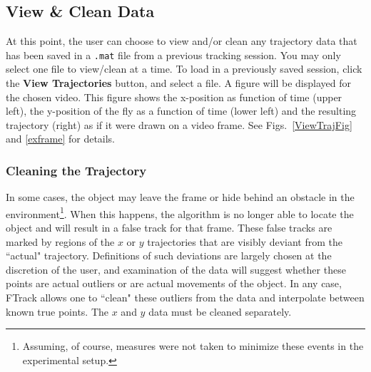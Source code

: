 \documentclass[letterpaper, 11pt]{article}
\begin{document}
\begin{enumerate}
\subsection*{View \& Clean Data}
At this point, the user can choose to view and/or clean any trajectory data that has been saved in
a \texttt{.mat} file from a previous tracking session.  You may only select one file to view/clean
at a time. To load in a previously saved session, click the \textbf{View Trajectories} button, and
select a file. A figure will be displayed for the chosen video.  This figure shows the x-position
as function of time (upper left), the y-position of the fly as a function of time (lower left) and
the resulting trajectory (right) as if it were drawn on a video frame.  See Figs.\
\ref{ViewTrajFig} and \ref{exframe} for details.


\subsubsection*{Cleaning the Trajectory} In some cases, the object may leave the frame or hide
behind an obstacle in the environment\footnote{Assuming, of course, measures were not taken to
minimize these events in the experimental setup.}. When this happens, the algorithm is no longer
able to locate the object and will result in a false track for that frame. These false tracks are
marked by regions of the $x$ or $y$ trajectories that are visibly deviant from the ``actual"
trajectory. Definitions of such deviations are largely chosen at the discretion of the user, and
examination of the data will suggest whether these points are actual outliers or are actual
movements of the object. In any case, FTrack allows one to ``clean" these outliers from the data
and interpolate between known true points.  The $x$ and $y$ data must be cleaned separately.
\end{enumerate}
\end{document}
